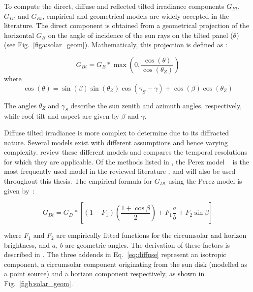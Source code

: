 To compute the direct, diffuse and reflected tilted irradiance components $G_{Bt}$, $G_{Dt}$ and $G_{Rt}$, empirical and geometrical models are widely accepted in the literature. 
The direct component is obtained from a geometrical projection of the horizontal $G_B$ on the angle of incidence of the sun rays on the tilted panel ($\theta$) (see Fig.~\ref{figa:solar_geom}). Mathematicaly, this projection is defined as \cite{gulin_estimation_2013}:

\begin{equation}
\label{eq:direct}
    G_{Bt} = G_{B} * \max \left( 0, \frac{\cos(\theta)}{\cos(\theta_Z)} \right)
\end{equation}
where
\begin{equation}
\label{eq:dir_angle}
\cos(\theta) = \sin(\beta) \sin(\theta_Z) \cos(\gamma_S - \gamma) + \cos(\beta) \cos(\theta_Z) 
\end{equation}

The angles $\theta_Z$ and $\gamma_S$ describe the sun zenith and azimuth angles, respectively, while roof tilt and aspect are given by $\beta$ and $\gamma$.

Diffuse tilted irradiance is more complex to determine due to its diffracted nature. Several models exist with different assumptions and hence varying complexity. \citet{assouline_estimation_2017} review these different models and compares the temporal resolutions for which they are applicable.
Of the methods listed in \citet{assouline_estimation_2017} , the Perez model ~\cite{perez_modeling_1990} is the most frequently used model in the reviewed literature \cite{buffat_scalable_2018,jakubiec_method_2013,mainzer_assessment_2017,wegertseder_combining_2016}, and will also be used throughout this thesis.
The empirical formula for $G_{Dt}$ using the Perez model is given by~\cite{perez_modeling_1990}:

\begin{equation}
\label{eq:diffuse}
G_{Dt} = G_D * \left[ (1 - F_1) \left( \frac{1 + \cos \beta}{2} \right) 
       + F_1 \frac{ a }{ b }
       + F_2 \sin \beta \right]
\end{equation}

where $F_1$ and $F_2$ are empirically fitted functions for the circumsolar and horizon brightness, and $a$, $b$ are geometric angles. The derivation of these factors is described in \cite{loutzenhiser_empirical_2007}. The three addends in Eq.~\ref{eq:diffuse} represent an isotropic component, a circumsolar component originating from the sun disk (modelled as a point source) and a horizon component respectively, as shown in Fig.~\ref{figb:solar_geom}.

